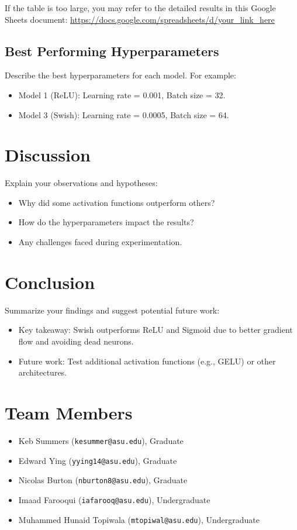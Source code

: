 \documentclass[11pt]{article}
\begin{document}
If the table is too large, you may refer to the detailed results in this Google Sheets document: \url{https://docs.google.com/spreadsheets/d/your_link_here}

\subsection*{Best Performing Hyperparameters}
Describe the best hyperparameters for each model. For example:
\begin{itemize}
    \item Model 1 (ReLU): Learning rate = 0.001, Batch size = 32.
    \item Model 3 (Swish): Learning rate = 0.0005, Batch size = 64.
\end{itemize}

\section*{Discussion}
Explain your observations and hypotheses:
\begin{itemize}
    \item Why did some activation functions outperform others?
    \item How do the hyperparameters impact the results?
    \item Any challenges faced during experimentation.
\end{itemize}

\section*{Conclusion}
Summarize your findings and suggest potential future work:
\begin{itemize}
    \item Key takeaway: Swish outperforms ReLU and Sigmoid due to better gradient flow and avoiding dead neurons.
    \item Future work: Test additional activation functions (e.g., GELU) or other architectures.
\end{itemize}

\section*{Team Members}
\begin{itemize}
    \item Keb Summers (\texttt{kesummer@asu.edu}), Graduate
    \item Edward Ying (\texttt{yying14@asu.edu}), Graduate
    \item Nicolas Burton (\texttt{nburton8@asu.edu}), Graduate
    \item Imaad Farooqui (\texttt{iafarooq@asu.edu}), Undergraduate
    \item Muhammed Hunaid Topiwala (\texttt{mtopiwal@asu.edu}), Undergraduate
\end{itemize}
\end{document}
